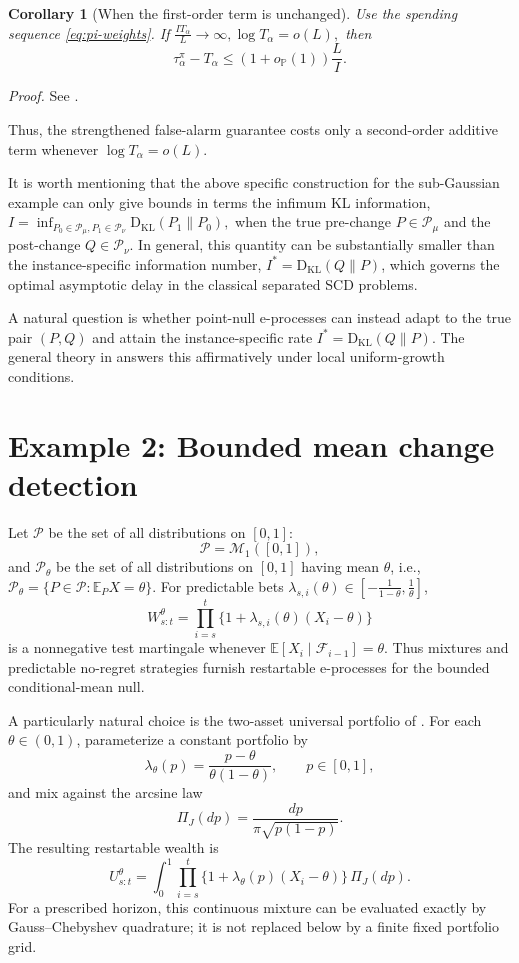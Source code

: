 \documentclass[12pt]{article}
\theoremstyle{spaced}
\newtheorem{corollary}[corollary]{Corollary}
\theoremstyle{remark}
\newcommand{\E}{\mathbb E}
\newcommand{\calP}{\mathcal P}
\newcommand{\bbP}{\mathbb P}
\newcommand{\KL}{\mathrm{D}_{\text{KL}}}
\begin{document}
\begin{corollary}[When the first-order term is unchanged]
\label{cor:first-order-same}
Use the spending sequence \eqref{eq:pi-weights}.  If $\frac{I T_\alpha}{L}\to\infty,
  \log T_\alpha=o(L),$
then
\[
  \tau_\alpha^\pi-T_\alpha
  \le
  (1+o_{\bbP}(1))\frac{L}{I}.
\]
\end{corollary}


\emph{Proof.} See .

Thus, the strengthened false-alarm guarantee costs only a second-order additive term whenever $\log T_\alpha=o(L)$.

It is worth mentioning that the above specific construction for the sub-Gaussian example can only give bounds in terms the infimum KL information, $I=\inf_{P_0\in \mathcal{P}_\mu,P_1\in \mathcal{P}_\nu}\KL(P_1\|P_0),$ when the true pre-change $P\in\mathcal{P}_\mu$ and the post-change $Q\in\mathcal{P}_\nu$. In general, this quantity can be substantially smaller than the instance-specific information number, $I^*=\KL(Q\|P)$, which governs the optimal asymptotic delay in the classical separated SCD problems.


A natural question is whether point-null e-processes can instead adapt to the true pair $(P,Q)$ and attain the instance-specific rate $I^*=\KL(Q\|P)$.  The general theory in  answers this affirmatively under local uniform-growth conditions.



\section{Example 2: Bounded mean change detection}
\label{sec:bounded-mean}
Let $\calP$ be the set of all distributions on $[0,1]$:
\[
 \mathcal P=\mathcal M_1([0,1]),
\]
and $\mathcal P_\theta$ be the set of all distributions on $[0,1]$ having mean $\theta$, i.e., $\mathcal P_\theta=\{P\in\mathcal P:\E_PX=\theta\}.$
For predictable bets $\lambda_{s,i}(\theta)\in\left[-\frac1{1-\theta},\frac1\theta\right]$,
\begin{equation}
\label{eq:bounded-linear-wealth-main}
 W_{s:t}^{\theta}=\prod_{i=s}^t
 \{1+\lambda_{s,i}(\theta)(X_i-\theta)\}
\end{equation}
is a nonnegative test martingale whenever
$\E[X_i\mid\mathcal F_{i-1}]=\theta$.  Thus mixtures and predictable
no-regret strategies furnish restartable e-processes for the bounded
conditional-mean null.

A particularly natural choice is the two-asset universal portfolio of
\citet{cover1991universal}.  For each $\theta\in(0,1)$, parameterize a constant portfolio by
\[
 \lambda_\theta(p)=\frac{p-\theta}{\theta(1-\theta)},\qquad p\in[0,1],
\]
and mix against the arcsine law
\[
 \Pi_J(dp)=\frac{dp}{\pi\sqrt{p(1-p)}}.
\]
The resulting restartable wealth is
\begin{equation}
\label{eq:bounded-UP-mixture}
 U_{s:t}^{\theta}
 =\int_0^1\prod_{i=s}^t
 \{1+\lambda_\theta(p)(X_i-\theta)\}\,\Pi_J(dp).
\end{equation}
For a prescribed horizon, this continuous mixture can be evaluated exactly
by Gauss--Chebyshev quadrature; it is not replaced below by a finite fixed
portfolio grid.
\end{document}
